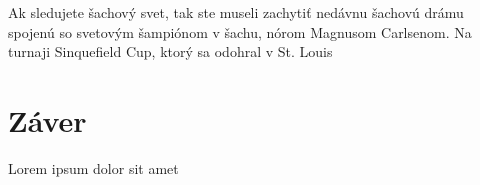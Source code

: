 \documentclass[10pt,oneside,slovak,a4paper]{article}
\begin{document}
Ak sledujete šachový svet, tak ste museli zachytiť nedávnu šachovú drámu spojenú so svetovým šampiónom v šachu, nórom Magnusom Carlsenom. Na turnaji Sinquefield Cup, ktorý sa odohral v St. Louis


\section{Záver}

Lorem ipsum dolor sit amet








\end{document}
